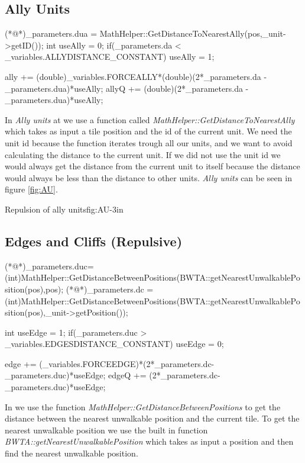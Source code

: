 	\subsection{Ally Units}
		\begin{Sourcecode}[caption=Ally units]
(*@\lnote@*)_parameters.dua = MathHelper::GetDistanceToNearestAlly(pos,_unit->getID());
int useAlly = 0;
if(_parameters.da < _variables.ALLYDISTANCE_CONSTANT)
	useAlly = 1;

ally += (double)_variables.FORCEALLY*(double)(2*_parameters.da - _parameters.dua)*useAlly;
allyQ += (double)(2*_parameters.da - _parameters.dua)*useAlly;
\end{Sourcecode}	
	In \textit{Ally units} at  we use a function called \textit{MathHelper::GetDistanceToNearestAlly} which takes as input a tile position and the id of the current unit. We need the unit id because the function iterates trough all our units, and we want to avoid calculating the distance to the current unit. If we did not use the unit id we would always get the distance from the current unit to itself because the distance would always be less than the distance to other units. \textit{Ally units} can be seen in figure \ref{fig:AU}.
	
			{Repulsion of ally units}{fig:AU}{-3in}


		\pagebreak
	\subsection{Edges and Cliffs (Repulsive)}
	\begin{Sourcecode}[caption=Edges and cliffs]
(*@\lnote@*)_parameters.duc= (int)MathHelper::GetDistanceBetweenPositions(BWTA::getNearestUnwalkablePosition(pos),pos);
(*@\lnote@*)_parameters.dc = (int)MathHelper::GetDistanceBetweenPositions(BWTA::getNearestUnwalkablePosition(pos),_unit->getPosition());

int useEdge = 1;
if(_parameters.duc > _variables.EDGESDISTANCE_CONSTANT)
	useEdge = 0;

edge += (_variables.FORCEEDGE)*(2*_parameters.dc-_parameters.duc)*useEdge;
edgeQ += (2*_parameters.dc-_parameters.duc)*useEdge;
\end{Sourcecode}	
    In  we use the function \textit{MathHelper::GetDistanceBetweenPositions} to get the distance between the nearest unwalkable position and the current tile. To get the nearest unwalkable position we use the built in function \textit{BWTA::getNearestUnwalkablePosition} which takes as input a position and then find the nearest unwalkable position. \\


